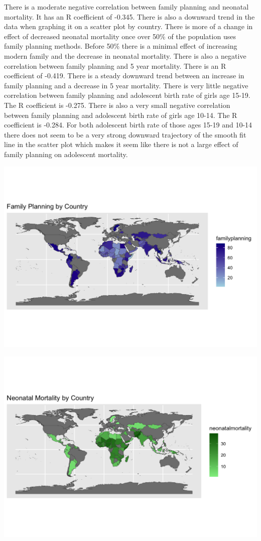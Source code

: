 \documentclass[
  letterpaper,
  DIV=11,
  numbers=noendperiod]{scrartcl}
\begin{document}
There is a moderate negative correlation between family planning and
neonatal mortality. It has an R coefficient of -0.345. There is also a
downward trend in the data when graphing it on a scatter plot by
country. There is more of a change in effect of decreased neonatal
mortality once over 50\% of the population uses family planning methods.
Before 50\% there is a minimal effect of increasing modern family and
the decrease in neonatal mortality. There is also a negative correlation
between family planning and 5 year mortality. There is an R coefficient
of -0.419. There is a steady downward trend between an increase in
family planning and a decrease in 5 year mortality. There is very little
negative correlation between family planning and adolescent birth rate
of girls age 15-19. The R coefficient is -0.275. There is also a very
small negative correlation between family planning and adolescent birth
rate of girls age 10-14. The R coefficient is -0.284. For both
adolescent birth rate of those ages 15-19 and 10-14 there does not seem
to be a very strong downward trajectory of the smooth fit line in the
scatter plot which makes it seem like there is not a large effect of
family planning on adolescent mortality.

\includegraphics{Density map family planning.png}

\includegraphics{density map neonatal.png}
\end{document}
